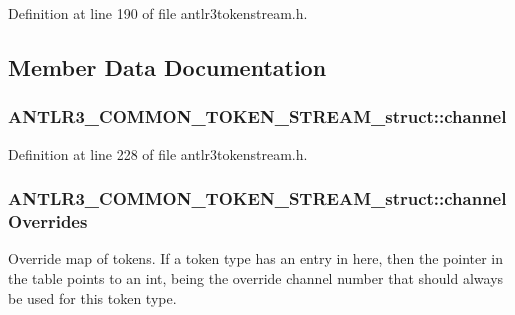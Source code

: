 Definition at line 190 of file antlr3tokenstream.\-h.



\subsection{Member Data Documentation}
\hypertarget{struct_a_n_t_l_r3___c_o_m_m_o_n___t_o_k_e_n___s_t_r_e_a_m__struct_a0d9d2e70946a56bb76f6748d55c80372}{
\subsubsection[{channel}]{ A\-N\-T\-L\-R3\-\_\-\-C\-O\-M\-M\-O\-N\-\_\-\-T\-O\-K\-E\-N\-\_\-\-S\-T\-R\-E\-A\-M\-\_\-struct\-::channel}}\label{struct_a_n_t_l_r3___c_o_m_m_o_n___t_o_k_e_n___s_t_r_e_a_m__struct_a0d9d2e70946a56bb76f6748d55c80372}


Definition at line 228 of file antlr3tokenstream.\-h.

\hypertarget{struct_a_n_t_l_r3___c_o_m_m_o_n___t_o_k_e_n___s_t_r_e_a_m__struct_a6002a039b9758a44262ad424a1652a7b}{
\subsubsection[{channel\-Overrides}]{ A\-N\-T\-L\-R3\-\_\-\-C\-O\-M\-M\-O\-N\-\_\-\-T\-O\-K\-E\-N\-\_\-\-S\-T\-R\-E\-A\-M\-\_\-struct\-::channel\-Overrides}}\label{struct_a_n_t_l_r3___c_o_m_m_o_n___t_o_k_e_n___s_t_r_e_a_m__struct_a6002a039b9758a44262ad424a1652a7b}
Override map of tokens. If a token type has an entry in here, then the pointer in the table points to an int, being the override channel number that should always be used for this token type. 

